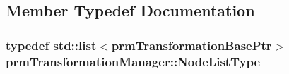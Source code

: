 \subsection{Member Typedef Documentation}
\hypertarget{classprm_transformation_manager_a7aaa30d4612656c91c80fc8ee8b96518}{
\subsubsection[{Node\-List\-Type}]{\setlength{\rightskip}{0pt plus 5cm}typedef std\-::list$<${\bf prm\-Transformation\-Base\-Ptr}$>$ {\bf prm\-Transformation\-Manager\-::\-Node\-List\-Type}}}\label{classprm_transformation_manager_a7aaa30d4612656c91c80fc8ee8b96518}


